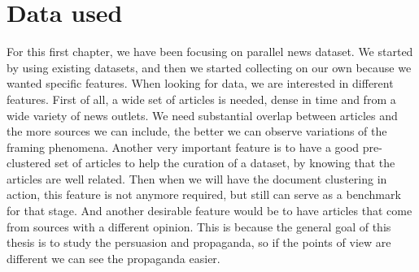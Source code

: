 





\section{Data used}
For this first chapter, we have been focusing on parallel news dataset. We started by using existing datasets, and then we started collecting on our own because we wanted specific features.
When looking for data, we are interested in different features.
First of all, a wide set of articles is needed, dense in time and from a wide variety of news outlets. We need substantial overlap between articles and the more sources we can include, the better we can observe variations of the framing phenomena.
Another very important feature is to have a good pre-clustered set of articles to help the curation of a dataset, %
by knowing that the articles are well related.
Then when we will have the document clustering in action, this feature is not anymore required, but still can serve as a benchmark for that stage.
And another desirable feature would be to have articles that come from sources with a different opinion. %
This is because the general goal of this thesis is to study the persuasion and propaganda, so if the points of view are different we can see the propaganda easier.

